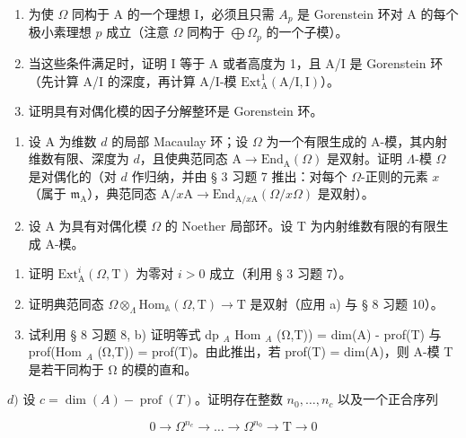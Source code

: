 \begin{enumerate}
\def\labelenumi{\alph{enumi})}
\item
  为使 \(\Omega\) 同构于 A 的一个理想 I，必须且只需 \(A_{p}\) 是 Gorenstein 环对 A 的每个极小素理想 \(p\) 成立（注意 \(\Omega\) 同构于 \(\bigoplus \Omega_{p}\) 的一个子模）。
\item
  当这些条件满足时，证明 I 等于 A 或者高度为 1，且 A/I 是 Gorenstein 环（先计算 A/I 的深度，再计算 A/I-模 \(\mathrm{Ext}_{\mathrm{A}}^{1}(\mathrm{A / I,I})\)）。
\item
  证明具有对偶化模的因子分解整环是 Gorenstein 环。
\end{enumerate}

\begin{enumerate}
\def\labelenumi{\arabic{enumi})}
\setcounter{enumi}{3}
\item
  设 A 为维数 \(d\) 的局部 Macaulay 环；设 \(\Omega\) 为一个有限生成的 A-模，其内射维数有限、深度为 \(d\)，且使典范同态 \(\mathrm{A} \to \mathrm{End}_{\mathrm{A}}(\Omega)\) 是双射。证明 \(\Lambda\)-模 \(\Omega\) 是对偶化的（对 \(d\) 作归纳，并由 § 3 习题 7 推出：对每个 \(\Omega\)-正则的元素 \(x\)（属于 \(\mathfrak{m}_{\mathrm{A}}\)），典范同态 \(\mathrm{A}/x\mathrm{A} \to \mathrm{End}_{\mathrm{A}/x\mathrm{A}}(\Omega/x\Omega)\) 是双射）。
\item
  设 A 为具有对偶化模 \(\Omega\) 的 Noether 局部环。设 T 为内射维数有限的有限生成 A-模。
\end{enumerate}

\begin{enumerate}
\def\labelenumi{\alph{enumi})}
\item
  证明 \(\mathrm{Ext}_{\mathrm{A}}^{i}(\Omega, \mathrm{T})\) 为零对 \(i > 0\) 成立（利用 § 3 习题 7）。
\item
  证明典范同态 \(\Omega\otimes_{\Lambda}\mathrm{Hom}_{\mathbb{A}}(\Omega,\mathrm{T})\to\mathrm{T}\) 是双射（应用 a) 与 § 8 习题 10）。
\item
  试利用 § 8 习题 8, b) 证明等式 dp \(_{A}\) Hom \(_{A}\) (Ω,T)) = dim(A) - prof(T) 与 prof(Hom \(_{A}\) (Ω,T)) = prof(T)。由此推出，若 prof(T) = dim(A)，则 A-模 T 是若干同构于 Ω 的模的直和。
\end{enumerate}

\(d)\) 设 \(c = \dim(A) - \operatorname{prof}(T)\)。证明存在整数 \(n_0, \ldots, n_c\) 以及一个正合序列

\[
0 \rightarrow \Omega^ {n _ {c}} \rightarrow \dots \rightarrow \Omega^ {n _ {0}} \rightarrow \mathrm{T} \rightarrow 0
\]

